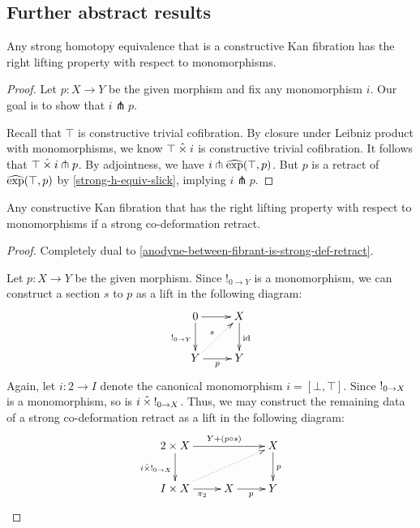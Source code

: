 \documentclass[reqno,10pt,a4paper,oneside]{amsart}
\begin{document}
\subsection{Further abstract results}

\begin{lemma}
Any strong homotopy equivalence that is a constructive Kan fibration has the right lifting property with respect to monomorphisms.
\end{lemma}

\begin{proof}
\label{strong-h-equiv-kan-is-trivial}
Let $p : X \to Y$ be the given morphism and fix any monomorphism $i$.
Our goal is to show that $i \pitchfork p$.

Recall that $\top$ is constructive trivial cofibration.
By closure under Leibniz product with monomorphisms, we know $\top \mathbin{\hat{\times}} i$ is constructive trivial cofibration.
It follows that $\top \mathbin{\hat{\times}} i \pitchfork p$.
By adjointness, we have $i \pitchfork \operatorname{\widehat{exp}}(\top, p)$.
But $p$ is a retract of $\operatorname{\widehat{exp}}(\top, p)$ by \cref{strong-h-equiv-slick}, implying $i \pitchfork p$.
\end{proof}

\begin{lemma}
Any constructive Kan fibration that has the right lifting property with respect to monomorphisms if a strong co-deformation retract.
\end{lemma}

\begin{proof}
Completely dual to \cref{anodyne-between-fibrant-is-strong-def-retract}.

Let $p : X \to Y$ be the given morphism.
Since $!_{0 \to Y}$ is a monomorphism, we can construct a section $s$ to $p$ as a lift in the following diagram:
\[
\xymatrix{
  0
  \ar[r]
  \ar[d]_{\canonical_{0 \to Y}}
&
  X
  \ar[d]^{\id}
\\
  Y
  \ar[r]_{p}
  \ar@{.>}[ur]^{s}
&
  Y
}
\]
Again, let $i : 2 \to I$ denote the canonical monomorphism $i = [\bot, \top]$.
Since $\mathord{!}_{0 \to X}$ is a monomorphism, so is $i \mathbin{\hat{\times}} \mathord{!}_{0 \to X}$.
Thus, we may construct the remaining data of a strong co-deformation retract as a lift in the following diagram:
\[
\xymatrix{
  2 \times X
  \ar[rr]^{Y + (p \cc s)}
  \ar[d]_{i \hattimes \canonical_{0 \to X}}
&&
  X
  \ar[d]^{p}
\\
  I \times X
  \ar[r]_{\pi_2}
  \ar@{.>}[urr]
&
  X
  \ar[r]_{p}
&
  Y
}
\]
\end{proof}
\end{document}
